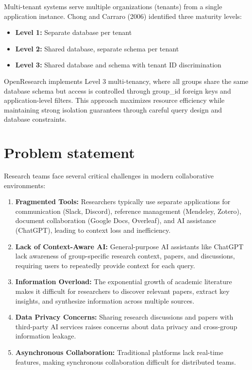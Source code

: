 \documentclass[12pt]{report}
\begin{document}
Multi-tenant systems serve multiple organizations (tenants) from a single application instance. Chong and Carraro (2006) identified three maturity levels:
\begin{itemize}
    \item \textbf{Level 1:} Separate database per tenant
    \item \textbf{Level 2:} Shared database, separate schema per tenant
    \item \textbf{Level 3:} Shared database and schema with tenant ID discrimination
\end{itemize}

OpenResearch implements Level 3 multi-tenancy, where all groups share the same database schema but access is controlled through group\_id foreign keys and application-level filters. This approach maximizes resource efficiency while maintaining strong isolation guarantees through careful query design and database constraints.

\section{Problem statement}

Research teams face several critical challenges in modern collaborative environments:

\begin{enumerate}
    \item \textbf{Fragmented Tools:} Researchers typically use separate applications for communication (Slack, Discord), reference management (Mendeley, Zotero), document collaboration (Google Docs, Overleaf), and AI assistance (ChatGPT), leading to context loss and inefficiency.
    
    \item \textbf{Lack of Context-Aware AI:} General-purpose AI assistants like ChatGPT lack awareness of group-specific research context, papers, and discussions, requiring users to repeatedly provide context for each query.
    
    \item \textbf{Information Overload:} The exponential growth of academic literature makes it difficult for researchers to discover relevant papers, extract key insights, and synthesize information across multiple sources.
    
    \item \textbf{Data Privacy Concerns:} Sharing research discussions and papers with third-party AI services raises concerns about data privacy and cross-group information leakage.
    
    \item \textbf{Asynchronous Collaboration:} Traditional platforms lack real-time features, making synchronous collaboration difficult for distributed teams.
\end{enumerate}
\end{document}
